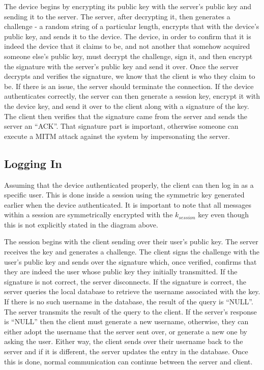 \documentclass{article}
\begin{document}
The device begins by encrypting its public key with the server's public key and sending it to the server. The server, after decrypting it, then generates a challenge - a random string of a particular length, encrypts that with the device's public key, and sends it to the device. The device, in order to confirm that it is indeed the device that it claims to be, and not another that somehow acquired someone else's public key, must decrypt the challenge, sign it, and then encrypt the signature with the server's public key and send it over. Once the server decrypts and verifies the signature, we know that the client is who they claim to be. If there is an issue, the server should terminate the connection. If the device authenticates correctly, the server can then generate a session key, encrypt it with the device key, and send it over to the client along with a signature of the key. The client then verifies that the signature came from the server and sends the server an ``ACK''. That signature part is important, otherwise someone can execute a MITM attack against the system by impersonating the server.

\subsection{Logging In}

Assuming that the device authenticated properly, the client can then log in as a specific user. This is done inside a session using the symmetric key generated earlier when the device authenticated. It is important to note that all messages within a session are symmetrically encrypted with the $k_{session}$ key even though this is not explicitly stated in the diagram above.

The session begins with the client sending over their user's public key. The server receives the key and generates a challenge. The client signs the challenge with the user's public key and sends over the signature which, once verified, confirms that they are indeed the user whose public key they initially transmitted. If the signature is not correct, the server disconnects. If the signature is correct, the server queries the local database to retrieve the username associated with the key. If there is no such username in the database, the result of the query is ``NULL''. The server transmits the result of the query to the client. If the server's response is ``NULL'' then the client must generate a new username, otherwise, they can either adopt the username that the server sent over, or generate a new one by asking the user. Either way, the client sends over their username back to the server and if it is different, the server updates the entry in the database. Once this is done, normal communication can continue between the server and client.
\end{document}
